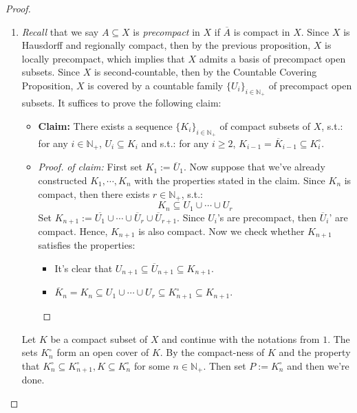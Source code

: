 \begin{proof}
    \begin{enumerate}
        \item \textit{Recall} that we say $A \subseteq X$ is \textit{precompact} in $X$ if $\overline{A}$ is compact in $X$. Since $X$ is Hausdorff and regionally compact, then by the previous proposition, $X$ is locally precompact, which implies that $X$ admits a basis of precompact open subsets. Since $X$ is second-countable, then by the Countable Covering Proposition, $X$ is covered by a countable family $\{U_i\}_{i \in \mathbb{N}_+}$ of precompact open subsets. It suffices to prove the following claim:
        \begin{itemize}
            \item \textbf{Claim:} There exists a sequence $\{K_i\}_{i \in \mathbb{N}_+}$ of compact subsets of $X$, s.t.: for any $i \in \mathbb{N}_+$, $U_i \subseteq K_i$ and s.t.: for any $i \geq 2$, $K_{i-1} = \overline{K}_{i-1} \subseteq K_i^\circ $.

            \item \begin{proof}
                \textit{of claim:} First set $K_1:= \overline{U}_1$. Now suppose that we've already constructed $K_1 ,\cdots, K_n$ with the properties stated in the claim. Since $K_n$ is compact, then there exists $r \in \mathbb{N}_+$, s.t.:
                $$K_n \subseteq U_1 \cup \cdots \cup U_r$$
                Set $K_{n+1}:= \overline{U_1} \cup \cdots \cup \overline{U}_r \cup \overline{U}_{r+1}$. Since $U_i$'s are precompact, then $\overline{U}_{i}$' are compact. Hence, $K_{n+1}$ is also compact. Now we check whether $K_{n+1}$ satisfies the properties:
                \begin{itemize}
                    \item It's clear that $U_{n+1} \subseteq \overline{U}_{n+1} \subseteq K_{n+1}$.
                    \item $\overline{K}_n = K_n \subseteq U_1 \cup \cdots \cup U_r \subseteq K_{n+1}^\circ \subseteq K_{n+1}$.
                \end{itemize}
            \end{proof}
        \end{itemize}

        Let $K$ be a compact subset of $X$ and continue with the notations from $1$. The sets $K_n ^\circ$ form an open cover of $K$. By the compact-ness of $K$ and the property that $K_n^\circ \subseteq K_{n+1}^\circ ,K \subseteq K_n^\circ$ for some $n \in \mathbb{N}_+$. Then set $P:= K_n ^\circ$ and then we're done.
    \end{enumerate}
\end{proof}

